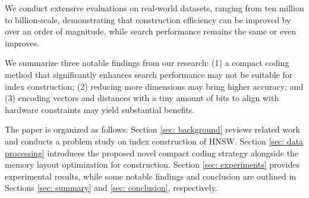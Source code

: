 \item We conduct extensive evaluations on real-world datasets, ranging from ten million to billion-scale, demonstrating that construction efficiency can be improved by over an order of magnitude, while search performance remains the same or even improves.

\item We summarize three notable findings from our research: (1) a compact coding method that significantly enhances search performance may not be suitable for index construction; (2) reducing more dimensions may bring higher accuracy; and (3) encoding vectors and distances with a tiny amount of bits to align with hardware constraints may yield substantial benefits.

\squishend

The paper is organized as follows: Section \ref{sec: background} reviews related work and conducts a problem study on index construction of HNSW. Section \ref{sec: data processing} introduces the proposed novel compact coding strategy alongside the memory layout optimization for  construction. Section \ref{sec: experiments} provides experimental results, while some notable findings and conclusion are outlined in Sections \ref{sec: summary} and \ref{sec: conclusion}, respectively.